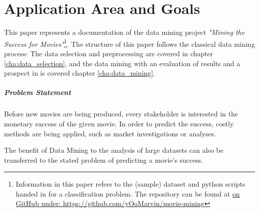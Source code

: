 \chapter{Application Area and Goals}
\label{cha:area_goals}
This paper represents a documentation of the data mining project \textit{"Mining the Success for Movies"}\footnote{Information in this paper refers to the (sample) dataset and python scripts handed in for a classification problem. The repository can be found at \hyperref{https://github.com/yOoMarvin/movie-mining}{external}{github}{on GitHub under: https://github.com/yOoMarvin/movie-mining}}. The structure of this paper follows the classical data mining process: The data selection and preprocessing are covered in chapter \ref{cha:data_selection}, and the data mining with an evaluation of results and a prospect in is covered chapter \ref{cha:data_mining}.


\paragraph{Problem Statement}
Before new movies are being produced, every stakeholder is interested in the monetary success of the given movie. In order to predict the success, costly methods are being applied, such as market investigations or analyses.

The benefit of Data Mining to the analysis of large datasets can also be transferred to the stated problem of predicting a movie's success. %

